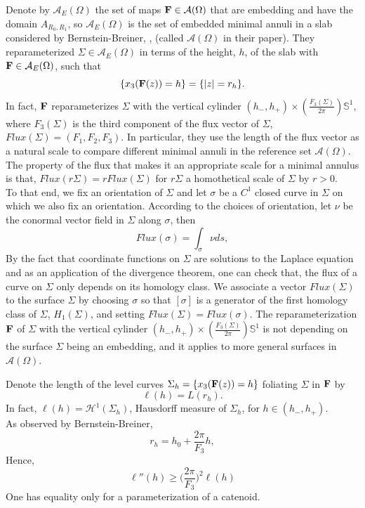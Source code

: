 \documentclass[11pt]{amsart}
\numberwithin{equation}{section}
\theoremstyle{theorem}
\theoremstyle{definition}
\numberwithin{equation}{section}
\begin{document}
Denote by $\mathcal{A}_E(\Omega)$ the set of maps $\bold{F} \in \mathcal{A}(\Omega)$ that are embedding and have the domain $A_{R_0,R_1}$, so $\mathcal{A}_E(\Omega)$ is the set of embedded minimal annuli in a slab considered by Bernstein-Breiner, \cite{bernstein2014variational}, (called $\mathcal{A}(\Omega)$ in their paper).
They reparameterized $\Sigma \in \mathcal{A}_E(\Omega)$ in terms of the height, $h$, of the slab with $\bold{F} \in \mathcal{A}_E(\Omega )$, such that 
\begin{equation}
    \nonumber
    \{ x_3(\bold{F}(z))=h \} =\{ \vert z \vert =r_h \}.
\end{equation}
In fact, $\bold{F}$ reparameterizes $\Sigma$ with the vertical cylinder $(h_-,h_+)\times (\frac{F_3(\Sigma)}{2\pi})\mathbb{S}^1$, where  $F_3(\Sigma)$ is the third component of the flux vector of $\Sigma$, $Flux(\Sigma)=(F_1,F_2,F_3)$. In particular, they use the length of the flux vector as a natural scale to compare different minimal annuli in the reference set $\mathcal{A}(\Omega)$. The property of the flux that makes it an appropriate scale for a minimal annulus is that, 
$
Flux(r\Sigma)=rFlux(\Sigma)
$
for $r\Sigma$ a homothetical scale of $\Sigma$ by $r>0$.\\
To that end, we fix an orientation of $\Sigma$ and let $\sigma$ be a $C^1$ closed curve in $\Sigma$ on which we also fix an orientation. According to the choices of orientation, let $\nu$ be the conormal vector field in $\Sigma$ along $\sigma$, then 
$$
Flux(\sigma)= \int_{\sigma} \nu ds,
$$
By the fact that coordinate functions on $\Sigma$ are solutions to the Laplace equation and as an application of the divergence theorem, one can check that, the flux of a curve on $\Sigma$ only depends on its homology class. We associate a vector $Flux(\Sigma)$ to the surface $\Sigma$ by choosing $\sigma$ so that $[\sigma]$ is a generator of the first homology class of $\Sigma$, $H_1(\Sigma)$, and setting $Flux(\Sigma)=Flux(\sigma)$.
The reparameterization $\bold{F}$ of $\Sigma$ with the vertical cylinder $(h_-,h_+)\times (\frac{F_3(\Sigma)}{2\pi})\mathbb{S}^1$ is not depending on the surface $\Sigma$ being an embedding, and it applies to more general surfaces in $\mathcal{A}(\Omega)$.
\medskip

Denote the length of the level curves $\Sigma_h=\{ x_3(\bold{F}(z))=h \}$ foliating $\Sigma$ in $\bold{F}$ by 
\begin{equation}
    \nonumber
    \ell (h) = L(r_h). 
\end{equation}
In fact, $\ell(h)=\mathcal{H}^1(\Sigma_h)$, Hausdorff measure of $\Sigma_h$, for $h\in (h_-,h_+)$.\\
As observed by Bernstein-Breiner,
\begin{equation}
    \nonumber
    r_h=h_0 + \frac{2\pi}{F_3} h ,
\end{equation}
Hence, 
\begin{equation}  \label{ineq: ell''-k^2m^2ell}
    \ell ''(h) \geq \Big ( \frac{2\pi}{F_3} \Big )^2 \ell (h)
\end{equation}
One has equality only for a parameterization of a catenoid. 
\medskip
\end{document}
